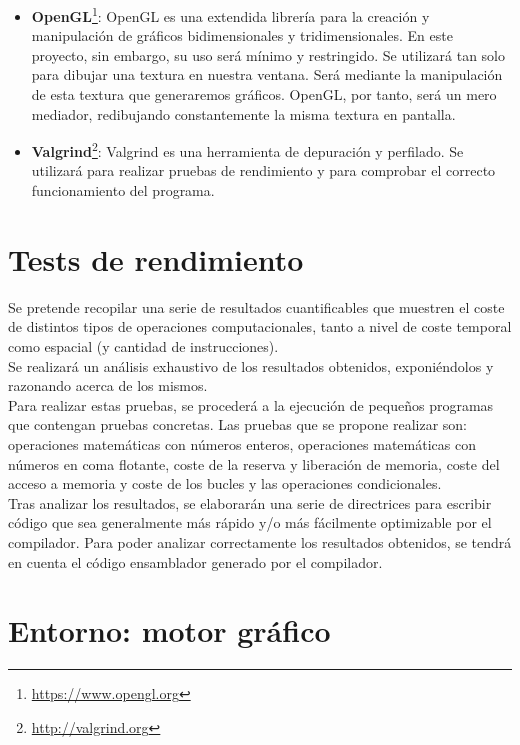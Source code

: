 \begin{itemize}
	\item \textbf{OpenGL}\footnote{\url{https://www.opengl.org}}: OpenGL es una extendida librería para la creación y manipulación de gráficos bidimensionales y tridimensionales. En este proyecto, sin embargo, su uso será mínimo y restringido. Se utilizará tan solo para dibujar una textura en nuestra ventana. Será mediante la manipulación de esta textura que generaremos gráficos. OpenGL, por tanto, será un mero mediador, redibujando constantemente la misma textura en pantalla.
	\item \textbf{Valgrind}\footnote{\url{http://valgrind.org}}: Valgrind es una herramienta de depuración y perfilado. Se utilizará para realizar pruebas de rendimiento y para comprobar el correcto funcionamiento del programa. 
\end{itemize}

\section{Tests de rendimiento}

Se pretende recopilar una serie de resultados cuantificables que muestren el coste de distintos tipos de operaciones computacionales, tanto a nivel de coste temporal como espacial (y cantidad de instrucciones).\\

Se realizará un análisis exhaustivo de los resultados obtenidos, exponiéndolos y razonando acerca de los mismos.\\

Para realizar estas pruebas, se procederá a la ejecución de pequeños programas que contengan pruebas concretas. Las pruebas que se propone realizar son: operaciones matemáticas con números enteros, operaciones matemáticas con números en coma flotante, coste de la reserva y liberación de memoria, coste del acceso a memoria y coste de los bucles y las operaciones condicionales.\\

Tras analizar los resultados, se elaborarán una serie de directrices para escribir código que sea generalmente más rápido y/o más fácilmente optimizable por el compilador. Para poder analizar correctamente los resultados obtenidos, se tendrá en cuenta el código ensamblador generado por el compilador.\\

\section{Entorno: motor gráfico}

